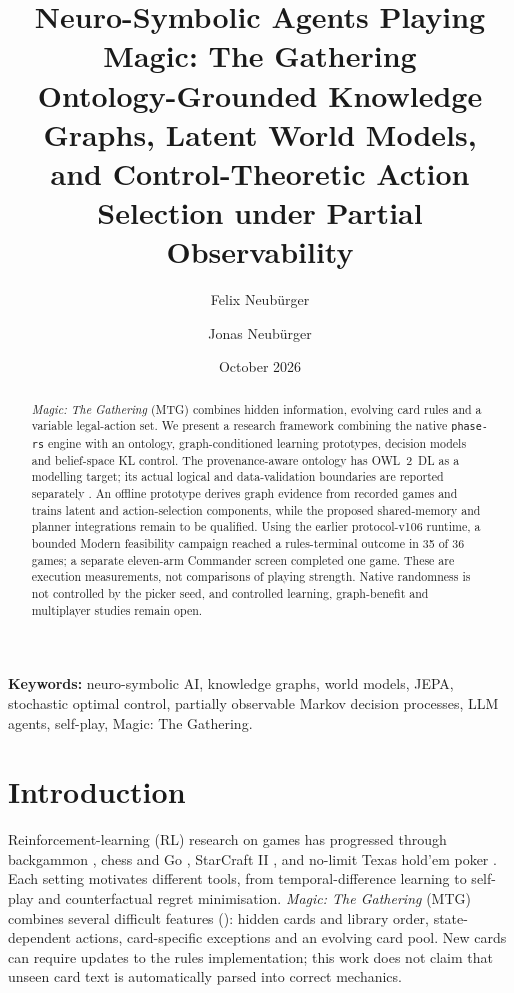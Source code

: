 \documentclass[11pt,a4paper]{article}
\title{\bfseries Neuro-Symbolic Agents Playing Magic: The Gathering\\[2pt]
       \large Ontology-Grounded Knowledge Graphs, Latent World Models,\\
       and Control-Theoretic Action Selection under Partial Observability}
\author[1]{Felix Neub\"urger}
\author[1]{Jonas Neub\"urger}
\affil[1]{Independent Research \\ \texttt{github.com/cuteredpwnda/opposition-agents-playing-mtg}}
\date{October 2026}
\theoremstyle{definition}
\theoremstyle{plain}
\begin{document}
\maketitle

\begin{abstract}
\noindent
\emph{Magic: The Gathering} (MTG) combines hidden information, evolving card rules and a variable legal-action set. We present a research framework combining the native \texttt{phase-rs} engine with an ontology, graph-conditioned learning prototypes, decision models and belief-space KL control. The provenance-aware ontology has OWL~2~DL as a modelling target; its actual logical and data-validation boundaries are reported separately \citep{neuburger2026ontology}. An offline prototype derives graph evidence from recorded games and trains latent and action-selection components, while the proposed shared-memory and planner integrations remain to be qualified. Using the earlier protocol-v106 runtime, a bounded Modern feasibility campaign reached a rules-terminal outcome in 35 of 36 games; a separate eleven-arm Commander screen completed one game. These are execution measurements, not comparisons of playing strength. Native randomness is not controlled by the picker seed, and controlled learning, graph-benefit and multiplayer studies remain open.
\end{abstract}

\vspace{0.5em}
\noindent\textbf{Keywords:} neuro-symbolic AI, knowledge graphs, world models, JEPA, stochastic optimal control, partially observable Markov decision processes, LLM agents, self-play, Magic: The Gathering.

\section{Introduction}
\label{sec:intro}

Reinforcement-learning (RL) research on games has progressed through backgammon \citep{tesauro1995temporal}, chess and Go \citep{silver2017mastering, silver2018alphazero}, StarCraft II \citep{vinyals2019grandmaster}, and no-limit Texas hold'em poker \citep{brown2018superhuman}. Each setting motivates different tools, from temporal-difference learning to self-play and counterfactual regret minimisation. \emph{Magic: The Gathering} (MTG) combines several difficult features (): hidden cards and library order, state-dependent actions, card-specific exceptions and an evolving card pool. New cards can require updates to the rules implementation; this work does not claim that unseen card text is automatically parsed into correct mechanics.
\end{document}
